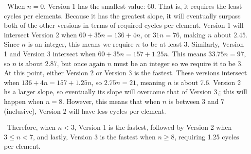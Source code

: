 \documentclass[12pt]{article}
\newenvironment{sol}[1][Solution]{\begin{trivlist}
		\item[\hskip \labelsep {\bfseries #1:}]}{\end{trivlist}}
\begin{document}
\begin{sol}
	\
	When $n=0$, Version 1 has the smallest value: 60. That is, it requires the least cycles
	per elements. Because it has the greatest slope, it will eventually surpass both
	of the other versions in terms of required cycles per element. Version 1 will intersect Version 2
	when $60+35n=136+4n$, or $31n=76$, making $n$ about $2.45$. Since $n$ is an integer, this
	means we require $n$ to be at least 3. Similarly, Version 1 and Version 3 intersect when
	$60+35n=157+1.25n$. This means $33.75n=97$, so $n$ is about $2.87$, but once again
	$n$ must be an integer so we require it to be 3. At this point, either Version 2 or
	Version 3 is the fastest. These versions intersect when $136+4n=157+1.25n$, so
	$2.75n=21$, meaning $n$ is about $7.6$. Version 2 hs a larger slope, so eventually its
	slope will overcome that of Version 3,; this will happen when $n=8$. However, this means
	that when $n$ is between 3 and 7 (inclusive), Version 2 will have less cycles per element.
	
	\
	Therefore, when $n < 3$, Version 1 is the fastest, followed by Version 2 when 
	$3\leq n < 7$, and lastly, Version 3 is the fastest when $n\geq 8$, requiring 1.25 cycles
	per element.
\end{sol}
\end{document}
